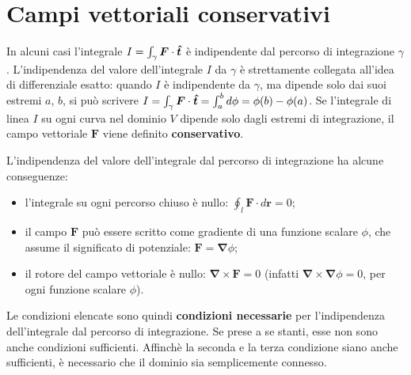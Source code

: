 
\section{Campi vettoriali conservativi}

In alcuni casi l'integrale $I = \int_\gamma \bm{F} \cdot \bm{\hat{t}}$ è indipendente dal percorso di integrazione $\gamma$. L'indipendenza del valore dell'integrale $I$ da $\gamma$ è strettamente collegata all'idea di differenziale esatto: quando $I$ è indipendente da $\gamma$, ma dipende solo dai suoi estremi $a$, $b$, si può scrivere $I = \int_\gamma \bm{F} \cdot \bm{\hat{t}} = \int_a^b d\phi = \phi(b) - \phi(a)$. Se l'integrale di linea $I$ su ogni curva nel dominio $V$ dipende solo dagli estremi di integrazione, il campo vettoriale $\bm{F}$ viene definito \textbf{conservativo}.

\noindent	
L'indipendenza del valore dell'integrale dal percorso di integrazione ha alcune conseguenze:
\begin{itemize}
\item l'integrale su ogni percorso chiuso è nullo: $\oint_{l} \bm{F} \cdot d\bm{r} = 0$;
\item il campo $\bm{F}$ può essere scritto come gradiente di una funzione scalare $\phi$, che assume
      il significato di potenziale: $\bm{F} = \bm{\nabla}\phi$;
\item il rotore del campo vettoriale è nullo: $\bm{\nabla} \times \bm{F} = 0$ (infatti $\bm{\nabla} \times \bm{\nabla} \phi= 0$,
 per ogni funzione scalare $\phi$).
\end{itemize}
%
Le condizioni elencate sono quindi \textbf{condizioni necessarie} per l'indipendenza dell'integrale dal percorso di integrazione.
Se prese a se stanti, esse non sono anche condizioni sufficienti. Affinchè la seconda e la terza condizione siano
anche sufficienti, è necessario che il dominio sia semplicemente connesso.
